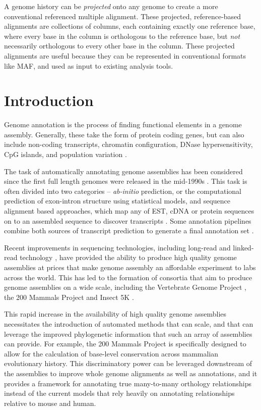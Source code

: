 \documentclass[fleqn,10pt]{wlscirep}
\begin{document}
A genome history can be \emph{projected} onto any genome to create a more conventional referenced multiple alignment.
These projected, reference-based alignments are collections of columns, each containing exactly one reference base, where every base in the column is orthologous to the reference base, but \emph{not} necessarily orthologous to every other base in the column.
These projected alignments are useful because they can be represented in conventional formats like MAF, and used as input to existing analysis tools.

\section{Introduction}

Genome annotation is the process of finding functional elements in a genome assembly. Generally, these take the form of protein coding genes, but can also include non-coding transcripts\cite{harrow2012gencode}, chromatin configuration, DNase hypersensitivity\cite{encode2004encode}, CpG islands, and population variation \cite{sherry2001dbsnp}.

The task of automatically annotating genome assemblies has been considered since the first full length genomes were released in the mid-1990s \cite{letovsky1998gdb,lukashin1998genemark,haussler1996generalized}. This task is often divided into two categories -- \textit{ab-initio} prediction, or the computational prediction of exon-intron structure using statistical models, and sequence alignment based approaches, which map any of EST, cDNA or protein sequences on to an assembled sequence to discover transcripts \cite{Aken01012016}. Some annotation pipelines combine both sources of transcript prediction to generate a final annotation set \cite{pruitt2006ncbi,cantarel2008maker}.

Recent improvements in sequencing technologies, including long-read \cite{gordon2016long} and linked-read technology \cite{10xassembly}, have provided the ability to produce high quality genome assemblies at prices that make genome assembly an affordable experiment to labs across the world. This has led to the formation of consortia that aim to produce genome assemblies on a wide scale, including the Vertebrate Genome Project \cite{haussler2009genome}, the 200 Mammals Project and Insect 5K \cite{robinson2011creating}.

This rapid increase in the availability of high quality genome assemblies necessitates the introduction of automated methods that can scale, and that can leverage the improved phylogenetic information that such an array of assemblies can provide. For example, the 200 Mammals Project is specifically designed to allow for the calculation of base-level conservation across mammalian evolutionary history. This discriminatory power can be leveraged downstream of the assemblies to improve whole genome alignments as well as annotations, and it provides a framework for annotating true many-to-many orthology relationships instead of the current models that rely heavily on annotating relationships relative to mouse and human.
\end{document}
